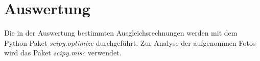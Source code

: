 \section{Auswertung}
Die in der Auswertung bestimmten Ausgleichsrechnungen werden mit
dem Python Paket \emph{scipy.optimize}\cite{scipy} durchgeführt. Zur Analyse der aufgenommen Fotos
wird das Paket \emph{scipy.misc}\cite{scipy} verwendet.

\FloatBarrier

\FloatBarrier

\FloatBarrier

